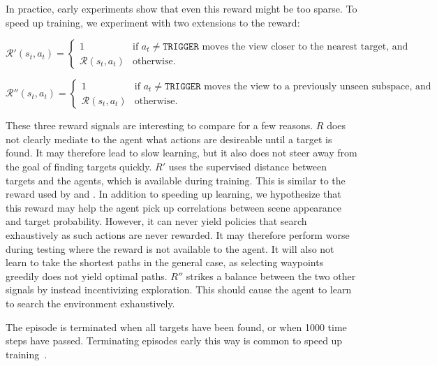 In practice, early experiments show that even this reward might be too sparse.
To speed up training, we experiment with two extensions to the reward:

\[
    \mathcal{R}'(s_t, a_t) =
    \begin{cases}
        1 & \text{if \(a_t \neq \mathtt{TRIGGER}\) moves the view closer to the nearest target, and} \\
        \mathcal{R}(s_t, a_t) & \text{otherwise}.
    \end{cases}
\]

\[
    \mathcal{R}''(s_t, a_t) =
    \begin{cases}
        1 & \text{if \(a_t \neq \mathtt{TRIGGER}\) moves the view to a previously unseen subspace, and} \\
        \mathcal{R}(s_t, a_t) & \text{otherwise}.
    \end{cases}
\]


These three reward signals are interesting to compare for a few reasons.
\(R\) does not clearly mediate to the agent what actions are desireable until a target is found.
It may therefore lead to slow learning, but it also does not steer away from the goal of finding targets quickly.
\(R'\) uses the supervised distance between targets and the agents, which is available during training.
This is similar to the reward used by \cite{caicedo_active_2015} and \cite{ghesu_multi_scale_2019}.
In addition to speeding up learning, we hypothesize that this reward may help the agent pick up correlations between scene appearance and target probability.
However, it can never yield policies that search exhaustively as such actions are never rewarded.
It may therefore perform worse during testing where the reward is not available to the agent.
It will also not learn to take the shortest paths in the general case, as selecting waypoints greedily does not yield optimal paths.
\(R''\) strikes a balance between the two other signals by instead incentivizing exploration.
This should cause the agent to learn to search the environment exhaustively.

The episode is terminated when all targets have been found, or when 1000 time steps have passed.
Terminating episodes early this way is common to speed up training~\cite{pardo_timelimits_2022}.


